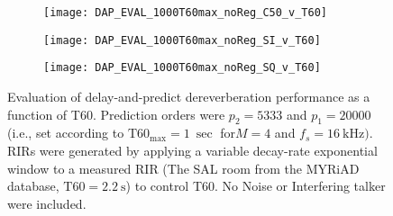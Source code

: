 
\begin{figure}[H]
	\centering
	\begin{subfigure}[b]{0.47\textwidth}
		\centering
		\texttt{[image: DAP\_EVAL\_1000T60max\_noReg\_C50\_v\_T60]}
	\end{subfigure}
	\begin{subfigure}[b]{0.92\textwidth}
		\centering
		\texttt{[image: DAP\_EVAL\_1000T60max\_noReg\_SI\_v\_T60]}
	\end{subfigure}
	\begin{subfigure}[b]{0.92\textwidth}
		\centering
		\texttt{[image: DAP\_EVAL\_1000T60max\_noReg\_SQ\_v\_T60]}
	\end{subfigure}
	\caption[DAP evaluation with $p_2=5333$]{Evaluation of delay-and-predict dereverberation performance as a function of T60. Prediction orders were $p_2 = 5333$ and $p_1=20000$ (i.e., set according to $\mathrm{T60}_{\mathrm{max}} = \qty{1}{\sec}$ for$M=4$ and $f_s=\qty{16}{\kilo\hertz})$. RIRs were generated by applying a variable decay-rate exponential window to a measured RIR (The SAL room from the MYRiAD database, $\mathrm{T60} = \qty{2.2}{\second}$) to control T60. No Noise or Interfering talker were included.}
	\label{fig:DAP_EVAL_1000T60max_noReg}
\end{figure}


